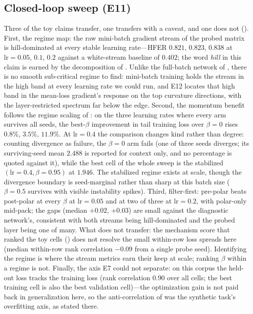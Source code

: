 \documentclass[11pt,a4paper]{article}
\theoremstyle{remark}
\begin{document}
\subsection{Closed-loop sweep (E11)}
\label{sec:e11}
Three of the toy claims transfer, one transfers with a caveat, and one does not ().
First, the regime map: the raw mini-batch gradient stream of the probed matrix is hill-dominated at every stable learning rate---HFER $0.821$, $0.823$, $0.838$ at $\mathrm{lr}=0.05$, $0.1$, $0.2$ against a white-stream baseline of $0.402$; the word \emph{hill} in this claim is earned by the decomposition of .
Unlike the full-batch network of , there is no smooth sub-critical regime to find: mini-batch training holds the stream in the high band at every learning rate we could run, and E12 locates that high band in the mean-loss gradient's response on the top curvature directions, with the layer-restricted spectrum far below the edge.
Second, the momentum benefit follows the regime scaling of : on the three learning rates where every arm survives all seeds, the best-$\beta$ improvement in tail training loss over $\beta=0$ rises $0.8\%$, $3.5\%$, $11.9\%$.
At $\mathrm{lr}=0.4$ the comparison changes kind rather than degree: counting divergence as failure, the $\beta=0$ arm fails (one of three seeds diverges; its surviving-seed mean $2.488$ is reported for context only, and no percentage is quoted against it), while the best cell of the whole sweep is the stabilized $(\mathrm{lr}=0.4,\beta=0.95)$ at $1.946$.
The stabilized regime exists at scale, though the divergence boundary is seed-marginal rather than sharp at this batch size ($\beta=0.5$ survives with visible instability spikes).
Third, filter-first: pre-polar beats post-polar at every $\beta$ at $\mathrm{lr}=0.05$ and at two of three at $\mathrm{lr}=0.2$, with polar-only mid-pack; the gaps (median $+0.02$, $+0.03$) are small against the diagnostic network's, consistent with both streams being hill-dominated and the probed layer being one of many.
What does not transfer: the mechanism score that ranked the toy cells () does not resolve the small within-row loss spreads here (median within-row rank correlation $-0.09$ from a single probe seed).
Identifying the regime is where the stream metrics earn their keep at scale; ranking $\beta$ within a regime is not.
Finally, the axis E7 could not separate: on this corpus the held-out loss tracks the training loss (rank correlation $0.90$ over all cells; the best training cell is also the best validation cell)---the optimization gain is not paid back in generalization here, so the anti-correlation of  was the synthetic task's overfitting axis, as stated there.
\end{document}
